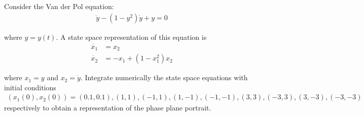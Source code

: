 \documentclass{article}
\begin{document}
  \newpage
  \section{}

  Consider the Van der Pol equation:
  \begin{align*}
    \ddot{y} - (1-y^2)\dot{y} + y = 0
  \end{align*}

  where $y=y(t)$. A state space representation of this equation is
  \begin{align*}
    \dot{x_1} &= x_2 \\
    \dot{x_2} &= -x_1 + (1-x_1^2)x_2
  \end{align*}

  where $x_1=y$ and $x_2=\dot{y}$. Integrate numerically the state space
  equations with initial conditions
  \begin{align*}
    (x_1(0), x_2(0)) = (0.1,0.1), (1,1), (-1,1), (1,-1), (-1,-1), (3,3), (-3,3), (3,-3), (-3,-3)
  \end{align*}
  respectively to obtain a representation of the phase plane portrait.

  
  
\end{document}
